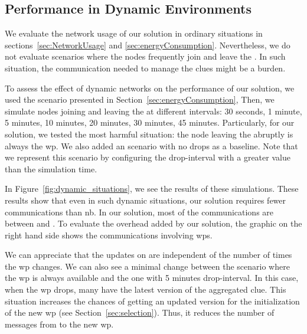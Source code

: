 \subsection{Performance in Dynamic Environments}
\label{sec:dynamic}
We evaluate the network usage of our solution in ordinary situations in sections~\ref{sec:NetworkUsage} and \ref{sec:energyConsumption}.
Nevertheless, we do not evaluate scenarios where the nodes frequently join and leave the \Space{}.
In such situation, the communication needed to manage the clues might be a burden.




To assess the effect of dynamic networks on the performance of our solution, we used the scenario presented in Section~\ref{sec:energyConsumption},
Then, we simulate nodes joining and leaving the \Space{} at different intervals: 30 seconds, 1 minute, 5 minutes, 10 minutes, 20 minutes, 30 minutes, 45 minutes.
Particularly, for our solution, we tested the most harmful situation: the node leaving the \Space{} abruptly is always the \ac{wp}.
We also added an scenario with no drops as a baseline.
Note that we represent this scenario by configuring the drop-interval with a greater value than the simulation time.

In Figure~\ref{fig:dynamic_situations}, we see the results of these simulations.
These results show that even in such dynamic situations, our solution requires fewer communications than \acl{nb}.
In our solution, most of the communications are between \consumers{} and \providers{}.
To evaluate the overhead added by our solution, the graphic on the right hand side shows the communications involving \acp{wp}.

We can appreciate that the updates on \consumers{} are independent of the number of times the \ac{wp} changes.
We can also see a minimal change between the scenario where the \ac{wp} is always available and the one with 5 minutes drop-interval.
In this case, when the \ac{wp} drops, many \consumers{} have the latest version of the aggregated clue.
This situation increases the chances of getting an updated version for the initialization of the new \ac{wp} (see Section~\ref{sec:selection}).
Thus, it reduces the number of messages from \providers{} to the new \ac{wp}.


